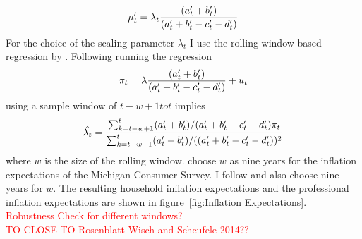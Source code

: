 \documentclass[review]{elsarticle}
\begin{document}
\begin{align*}
\mu_t\sp{\prime} = \lambda_t \frac{(a_t\sp{\prime} + b_t\sp{\prime})}{(a_t\sp{\prime} + b_t\sp{\prime} - c_t\sp{\prime} - d_t\sp{\prime})}
\end{align*}
For the choice of the scaling parameter $\lambda_t$ I use the rolling window based regression by \cite{Lahiri2015}. Following \cite{Rosenblatt-Wisch2015} running the regression
\begin{align*}
\pi_t = \lambda \frac{(a_t\sp{\prime} + b_t\sp{\prime})}{(a_t\sp{\prime} + b_t\sp{\prime} - c_t\sp{\prime} - d_t\sp{\prime})} + u_t 
\end{align*}
using a sample window of $t - w + 1 to t$ implies
\begin{align*}
\hat{\lambda_t} = \frac{\sum^t_{k = t-w+1}(a_t\sp{\prime} + b_t\sp{\prime})/(a_t\sp{\prime} + b_t\sp{\prime} - c_t\sp{\prime} - d_t\sp{\prime})\pi_t}{\sum^t_{k = t-w+1}(a_t\sp{\prime} + b_t\sp{\prime})/((a_t\sp{\prime} + b_t\sp{\prime} - c_t\sp{\prime} - d_t\sp{\prime}))^2}
\end{align*}
where $w$ is the size of the rolling window. \cite{Lahiri2015} choose $w$ as nine years for the inflation expectations of the Michigan Consumer Survey. I follow \cite{Lahiri2015} and also choose nine years for $w$. The resulting household inflation expectations and the professional inflation expectations are shown in figure~\ref{fig:Inflation Expectations}.
\\
\textcolor{red}{Robustness Check for different windows?}
\\
\textcolor{red}{TO CLOSE TO Rosenblatt-Wisch and Scheufele 2014??}
\end{document}
